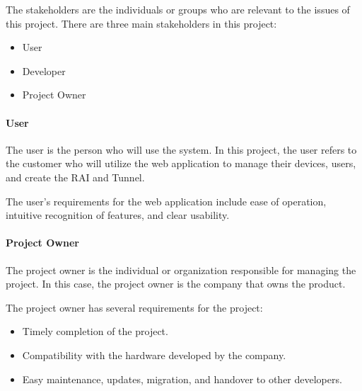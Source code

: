 The stakeholders are the individuals or groups who are relevant 
to the issues of this project.
There are three main stakeholders in this project:
\begin{itemize}
    \item User
    \item Developer
    \item Project Owner
\end{itemize}

\paragraph{User} 


The user is the person who will use the system. 
In this project, the user refers to the customer 
who will utilize the web application 
to manage their devices, users, and create the RAI and Tunnel.

The user's requirements for the web application 
include ease of operation, 
intuitive recognition of features, 
and clear usability.

\paragraph{Project Owner}


The project owner is the individual or organization responsible for managing the project. In this case, the project owner is the company that owns the product.

The project owner has several requirements for the project:

\begin{itemize}
    \item Timely completion of the project.
    \item Compatibility with the hardware developed by the company.
    \item Easy maintenance, updates, migration, and handover to other developers.
\end{itemize}

